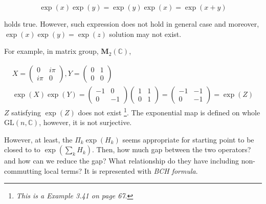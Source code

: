 \begin{equation}
    \exp(x) \exp(y) = \exp(y) \exp(x) = \exp(x+y)
\end{equation}

holds true. However, such expression does not hold in general case and moreover, 
$\exp(x)\exp(y) = \exp(z)$ solution may not exist.

For example, in matrix group, $\mathbf{M}_2 (\mathbb{C})$,

\begin{eqnarray}
    X = \begin{pmatrix}
        0     & i \pi \\
        i \pi & 0 
    \end{pmatrix}, 
    Y = \begin{pmatrix}
        0     & 1 \\
        0     & 0 
    \end{pmatrix} \\
    \exp(X) \exp(Y) =  
    \begin{pmatrix}
        -1  & 0 \\
        0   & -1 
    \end{pmatrix}
    \begin{pmatrix}
        1 & 1 \\
        0 & 1 
    \end{pmatrix} =
    \begin{pmatrix}
        -1     & -1 \\
        0 & -1 
    \end{pmatrix} = \exp(Z) \label{eq:non-exist-expz}
\end{eqnarray}
$Z$ satisfying $\exp(Z)$ does not exist
\cite{hall2015lie}\footnote[4]{
    \textit{This is a Example 3.41 on page 67}.
}. The exponential map is defined on whole $\text{GL}(n, \mathbb{C})$, however, 
it is not surjective.

However, at least, the $\Pi_k \exp\left(H_k\right)$
seems appropriate for starting point to be closed to
to $\exp\left( \sum_k H_k \right)$.
Then, how much gap between the two operators? and
how can we reduce the gap?
What relationship do they have including non-commutting local terms?
It is represented with \textit{BCH formula}\cite{suzuki_convergence_1977}.

